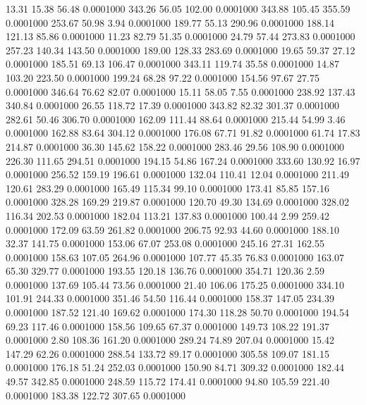   13.31   15.38   56.48   0.0001000
 343.26   56.05  102.00   0.0001000
 343.88  105.45  355.59   0.0001000
 253.67   50.98    3.94   0.0001000
 189.77   55.13  290.96   0.0001000
 188.14  121.13   85.86   0.0001000
  11.23   82.79   51.35   0.0001000
  24.79   57.44  273.83   0.0001000
 257.23  140.34  143.50   0.0001000
 189.00  128.33  283.69   0.0001000
  19.65   59.37   27.12   0.0001000
 185.51   69.13  106.47   0.0001000
 343.11  119.74   35.58   0.0001000
  14.87  103.20  223.50   0.0001000
 199.24   68.28   97.22   0.0001000
 154.56   97.67   27.75   0.0001000
 346.64   76.62   82.07   0.0001000
  15.11   58.05    7.55   0.0001000
 238.92  137.43  340.84   0.0001000
  26.55  118.72   17.39   0.0001000
 343.82   82.32  301.37   0.0001000
 282.61   50.46  306.70   0.0001000
 162.09  111.44   88.64   0.0001000
 215.44   54.99    3.46   0.0001000
 162.88   83.64  304.12   0.0001000
 176.08   67.71   91.82   0.0001000
  61.74   17.83  214.87   0.0001000
  36.30  145.62  158.22   0.0001000
 283.46   29.56  108.90   0.0001000
 226.30  111.65  294.51   0.0001000
 194.15   54.86  167.24   0.0001000
 333.60  130.92   16.97   0.0001000
 256.52  159.19  196.61   0.0001000
 132.04  110.41   12.04   0.0001000
 211.49  120.61  283.29   0.0001000
 165.49  115.34   99.10   0.0001000
 173.41   85.85  157.16   0.0001000
 328.28  169.29  219.87   0.0001000
 120.70   49.30  134.69   0.0001000
 328.02  116.34  202.53   0.0001000
 182.04  113.21  137.83   0.0001000
 100.44    2.99  259.42   0.0001000
 172.09   63.59  261.82   0.0001000
 206.75   92.93   44.60   0.0001000
 188.10   32.37  141.75   0.0001000
 153.06   67.07  253.08   0.0001000
 245.16   27.31  162.55   0.0001000
 158.63  107.05  264.96   0.0001000
 107.77   45.35   76.83   0.0001000
 163.07   65.30  329.77   0.0001000
 193.55  120.18  136.76   0.0001000
 354.71  120.36    2.59   0.0001000
 137.69  105.44   73.56   0.0001000
  21.40  106.06  175.25   0.0001000
 334.10  101.91  244.33   0.0001000
 351.46   54.50  116.44   0.0001000
 158.37  147.05  234.39   0.0001000
 187.52  121.40  169.62   0.0001000
 174.30  118.28   50.70   0.0001000
 194.54   69.23  117.46   0.0001000
 158.56  109.65   67.37   0.0001000
 149.73  108.22  191.37   0.0001000
   2.80  108.36  161.20   0.0001000
 289.24   74.89  207.04   0.0001000
  15.42  147.29   62.26   0.0001000
 288.54  133.72   89.17   0.0001000
 305.58  109.07  181.15   0.0001000
 176.18   51.24  252.03   0.0001000
 150.90   84.71  309.32   0.0001000
 182.44   49.57  342.85   0.0001000
 248.59  115.72  174.41   0.0001000
  94.80  105.59  221.40   0.0001000
 183.38  122.72  307.65   0.0001000
